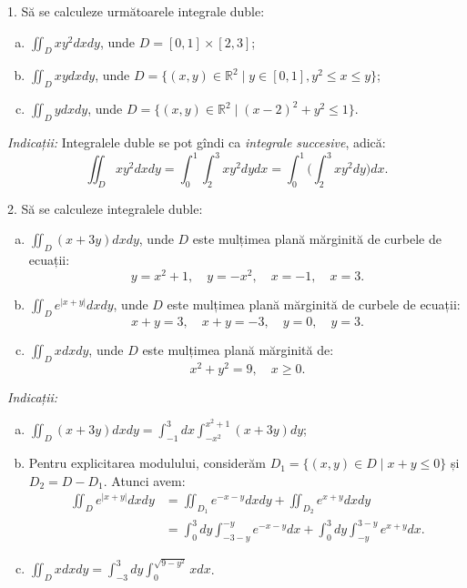 \documentclass[11pt,a4paper]{article}
\newcommand\ds{\displaystyle}
\newcommand\RR{\mathbb{R}}
\theoremstyle{dotless}
\theoremstyle{dotlessdr}
\begin{document}
1. Să se calculeze următoarele integrale duble:
\begin{enumerate}[(a)]
\item $\ds\iint_D xy^2 dx dy$, unde $D = [0, 1] \times [2, 3]$;
\item $\ds\iint_D xy dx dy$, unde $D = \{(x, y) \in \RR^2 \mid y \in [0, 1], y^2 \leq x \leq y \}$;
\item $\ds\iint_D y dxdy$, unde $D = \{(x, y) \in \RR^2 \mid (x - 2)^2 + y^2 \leq 1\}$.
\end{enumerate}

\emph{Indicații:} Integralele duble se pot gîndi ca \emph{integrale succesive}, adică:
\[
  \iint_D xy^2 dx dy = \int_0^1 \int_2^3 xy^2 dy dx = \int_0^1 \Big( \int_2^3 xy^2 dy \Big) dx.
\]

\vspace{1cm}

2. Să se calculeze integralele duble:
\begin{enumerate}[(a)]
\item $\ds\iint_D (x + 3y) dx dy$, unde $D$ este mulțimea plană mărginită de
  curbele de ecuații:
  \[
    y = x^2 + 1, \quad y = -x^2, \quad x = -1, \quad x = 3.
  \]
\item $\ds\iint_D e^{|x + y|} dx dy$, unde $D$ este mulțimea plană mărginită de
  curbele de ecuații:
  \[
    x + y = 3, \quad x + y = -3, \quad y = 0, \quad y = 3.
  \]
\item $\ds\iint_D xdxdy$, unde $D$ este mulțimea plană mărginită de:
  \[
    x^2 + y^2 = 9, \quad x \geq 0.
  \]
\end{enumerate}

\emph{Indicații:}
\begin{enumerate}[(a)]
\item $\ds\iint_D (x + 3y) dx dy = \ds\int_{-1}^3 dx \ds\int_{-x^2}^{x^2 + 1} (x + 3y) dy$;
\item Pentru explicitarea modulului, considerăm $D_1 = \{(x, y) \in D \mid x + y \leq 0 \}$
  și $D_2 = D - D_1$. Atunci avem:
  \begin{align*}
    \iint_D e^{|x + y|} dx dy &= \iint_{D_1} e^{-x-y} dx dy + \iint_{D_2} e^{x+y} dx dy \\
                              &= \int_0^3 dy \int_{-3-y}^{-y} e^{-x - y} dx + %
                                \int_0^3 dy \int_{-y}^{3 - y} e^{x + y} dx.
  \end{align*}
\item $\ds\iint_D xdxdy = \int_{-3}^3 dy \int_0^{\sqrt{9 - y^2}} xdx$.
\end{enumerate}
\end{document}
